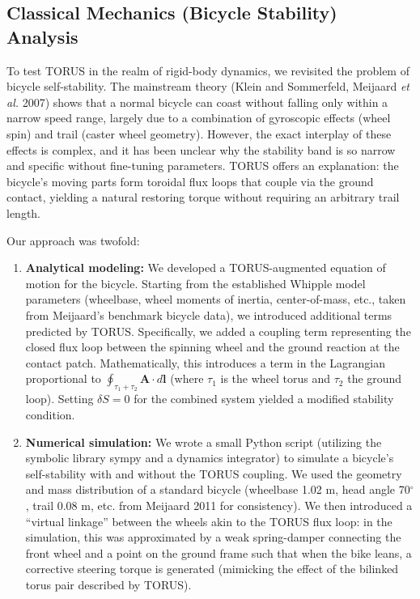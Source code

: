 \documentclass{article}
\begin{document}
\subsection{Classical Mechanics (Bicycle Stability) Analysis}\label{sec:methods_bike}
To test TORUS in the realm of rigid-body dynamics, we revisited the problem of bicycle self-stability. The mainstream theory (Klein and Sommerfeld, Meijaard \emph{et al.} 2007) shows that a normal bicycle can coast without falling only within a narrow speed range, largely due to a combination of gyroscopic effects (wheel spin) and trail (caster wheel geometry). However, the exact interplay of these effects is complex, and it has been unclear why the stability band is so narrow and specific without fine-tuning parameters. TORUS offers an explanation: the bicycle's moving parts form toroidal flux loops that couple via the ground contact, yielding a natural restoring torque without requiring an arbitrary trail length.

Our approach was twofold:
\begin{enumerate}\itemsep 0pt
    \item \textbf{Analytical modeling:} We developed a TORUS-augmented equation of motion for the bicycle. Starting from the established Whipple model parameters (wheelbase, wheel moments of inertia, center-of-mass, etc., taken from Meijaard's benchmark bicycle data), we introduced additional terms predicted by TORUS. Specifically, we added a coupling term representing the closed flux loop between the spinning wheel and the ground reaction at the contact patch. Mathematically, this introduces a term in the Lagrangian proportional to $\oint_{\tau_1+\tau_2} \mathbf{A}\cdot d\mathbf{l}$ (where $\tau_1$ is the wheel torus and $\tau_2$ the ground loop). Setting $\delta S=0$ for the combined system yielded a modified stability condition.
    \item \textbf{Numerical simulation:} We wrote a small Python script (utilizing the symbolic library sympy and a dynamics integrator) to simulate a bicycle's self-stability with and without the TORUS coupling. We used the geometry and mass distribution of a standard bicycle (wheelbase 1.02 m, head angle 70$^\circ$, trail 0.08 m, etc. from Meijaard 2011 for consistency). We then introduced a “virtual linkage” between the wheels akin to the TORUS flux loop: in the simulation, this was approximated by a weak spring-damper connecting the front wheel and a point on the ground frame such that when the bike leans, a corrective steering torque is generated (mimicking the effect of the bilinked torus pair described by TORUS).
\end{enumerate}
\end{document}
